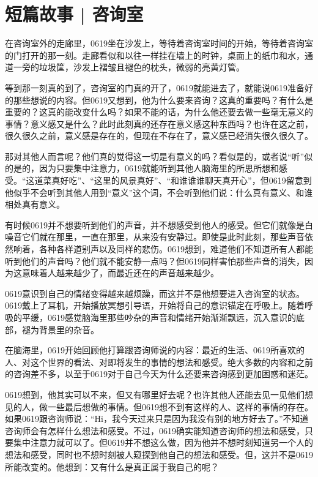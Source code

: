 \chapter{短篇故事 | 咨询室}



在咨询室外的走廊里，0619坐在沙发上，等待着咨询室时间的开始，等待着咨询室的门打开的那一刻。走廊看似和以往一样\pozhehao{}挂在墙上的时钟，桌面上的纸巾和水，通道一旁的垃圾筐，沙发上褶皱且褪色的枕头，微弱的亮黄灯管。

等到那一刻真的到了，咨询室的门真的开了，0619就能进去了，就能说0619准备好的那些想说的内容。但0619又想到，他为什么要来咨询？这真的重要吗？有什么是重要的？这真的能改变什么吗？如果不能的话，为什么他还要去做一些毫无意义的事情？意义感又是什么？此时此刻真的还存在意义感这种东西吗？也许在这之前，很久很久之前，意义感是存在的，但现在不存在了，意义感已经消失很久很久了。

那对其他人而言呢？他们真的觉得这一切是有意义的吗？看似是的，或者说“听”似的是的，因为只要集中注意力，0619就能听到其他人脑海里的所思所想和感受。“这道菜真好吃”、“这里的风景真好”、“和谁谁谁聊天真开心”，但0619留意到他似乎不会听到其他人用到“意义”这个词，不会听到他们说：什么真有意义、和谁相处真有意义。

有时候0619并不想要听到他们的声音，并不想感受到他人的感受。但它们就像是白噪音\pozhehao{}它们就在那里，一直在那里，从来没有安静过。即使是此时此刻，那些声音依然响着，各种各样道别声以及同样的悲伤。0619想到，难道他们不知道所有人都能听到他们的声音吗？他们就不能安静一点吗？但0619同样害怕那些声音的消失，因为这意味着人越来越少了，而最近还在的声音越来越少。

0619意识到自己的情绪变得越来越烦躁，而这并不是他想要进入咨询室的状态。0619戴上了耳机，开始播放冥想引导语，开始将自己的意识锚定在呼吸上。随着呼吸的平缓，0619感觉脑海里那些吵杂的声音和情绪开始渐渐飘远，沉入意识的底部，褪为背景里的杂音。

在脑海里，0619开始回顾他打算跟咨询师说的内容：最近的生活、0619所喜欢的人、对这个世界的看法、对即将发生的事情的想法和感受。绝大多数的内容和之前的咨询差不多，以至于0619对于自己今天为什么还要来咨询感到更加困惑和迷茫。

0619想到，他其实可以不来，但又有哪里好去呢？也许其他人还能去见一见他们想见的人，做一些最后想做的事情。但0619想不到有这样的人、这样的事情的存在。如果0619跟咨询师说：“Hi，我今天过来只是因为我没有别的地方好去了。”不知道咨询师会有怎样什么想法和感受。不过，0619确实能知道咨询师的想法和感受，只要集中注意力就可以了。但0619并不想这么做，因为他并不想时刻知道另一个人的想法和感受，同时也不想时刻被人窥探到他自己的想法和感受。但，这并不是0619所能改变的。他想到：又有什么是真正属于我自己的呢？


